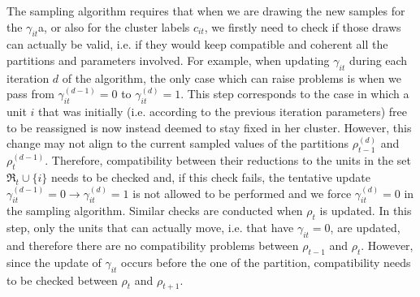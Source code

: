 \documentclass[12pt,	%
	a4paper,		%
	twoside,		%
	openright,		%
	titlepage,%
	]{book}
\theoremstyle{definition}
\begin{document}
The sampling algorithm requires that when we are drawing the new samples for the $\gamma_{it}$a, or also for the cluster labels $c_{it}$, we firstly need to check if those draws can actually be valid, i.e. if they would keep compatible and coherent all the partitions and parameters involved. For example, when updating $\gamma_{it}$ during each iteration $d$ of the algorithm, the only case which can raise problems is when we pass from $\gamma_{it}^{(d-1)}=0$ to $\gamma_{it}^{(d)}=1$. This step corresponds to the case in which a unit $i$ that was initially (i.e. according to the previous iteration parameters) free to be reassigned is now instead deemed to stay fixed in her cluster. However, this change may not align to the current sampled values of the partitions $\rho_{t-1}^{(d)}$ and $\rho_t^{(d-1)}$. Therefore, compatibility between their reductions to the units in the set $\mathfrak{R}_t \cup \{i\}$ needs to be checked and, if this check fails, the tentative update $\gamma_{it}^{(d-1)}=0 \to \gamma_{it}^{(d)}=1$ is not allowed to be performed and we force $\gamma_{it}^{(d)}=0$ in the sampling algorithm. Similar checks are conducted when $\rho_t$ is updated. In this step, only the units that can actually move, i.e. that have $\gamma_{it}=0$, are updated, and therefore there are no compatibility problems between $\rho_{t-1}$ and $\rho_t$. However, since the update of $\gamma_{it}$ occurs before the one of the partition, compatibility needs to be checked between $\rho_{t}$ and $\rho_{t+1}$. 
\end{document}
